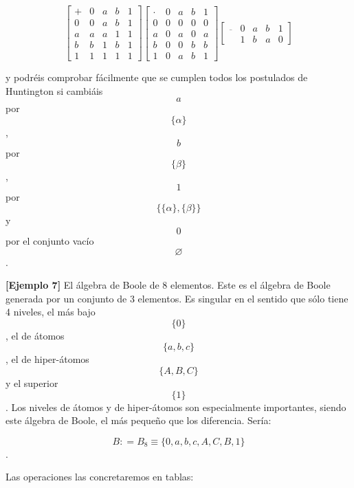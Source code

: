 \begin{enumerate}
  \[\begin{bmatrix}
   + & 0 & a & b & 1 \\
  0 & 0 & a & b & 1 \\
  a & a & a & 1 & 1 \\
  b & b & 1 & b & 1 \\
  1 & 1 & 1 & 1 & 1
  \end{bmatrix}\begin{bmatrix}
   \cdot & 0 & a & b & 1 \\
  0 & 0 & 0 & 0 & 0 \\
  a & 0 & a & 0 & a \\
  b & 0 & 0 & b & b \\
  1 & 0 & a & b & 1
  \end{bmatrix}\begin{bmatrix}
  \overline{} & 0 & a & b & 1 \\
   & 1 & b & a & 0
  \end{bmatrix}\]

  y podréis comprobar fácilmente que se cumplen todos los postulados de
  Huntington si cam\-biáis \[a\] por \[\{\alpha\}\], \[b\] por
  \[\{\beta\}\], \[1\] por \[\{{{\{\alpha\}},{\{\beta\}}}\}\] y \[0\]
  por el conjunto vacío \[\varnothing\].

  \textbf{{[}Ejemplo 7{]}} El álgebra de Boole de 8 elementos. Este es
  el álgebra de Boole generada por un conjunto de 3 elementos. Es
  singular en el sentido que sólo tiene 4 niveles, el más bajo
  \[\{ 0\}\], el de átomos \[\{{a,b,c}\}\], el de hiper-átomos
  \[\{{A,B,C}\}\] y el superior \[\{ 1\}\]. Los niveles de átomos y de
  hiper-átomos son especialmente importantes, siendo este álge\-bra de
  Boole, el más pequeño que los diferencia. Sería:

  \[B{{: = B_{8}} \equiv {\{{0,a,b,c,A,C,B,1}\}}}\].

  Las operaciones las concretaremos en tablas:


\end{enumerate}
